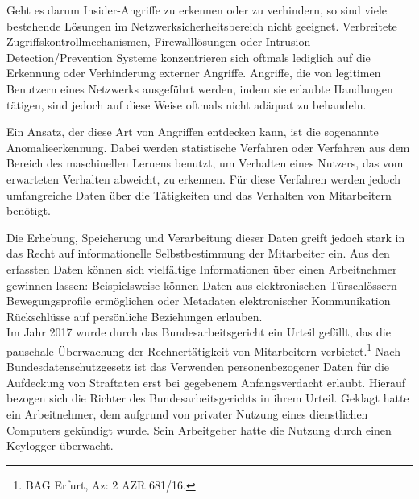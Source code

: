 
Geht es darum Insider-Angriffe zu erkennen oder zu verhindern, so sind viele bestehende Lösungen im Netzwerksicherheitsbereich nicht geeignet. Verbreitete Zugriffskontrollmechanismen, Firewalllösungen oder Intrusion Detection/Prevention Systeme konzentrieren sich oftmals lediglich auf die Erkennung oder Verhinderung externer Angriffe. Angriffe, die von legitimen Benutzern eines Netzwerks ausgeführt werden, indem sie erlaubte Handlungen tätigen, sind jedoch auf diese Weise oftmals nicht adäquat zu behandeln.

Ein Ansatz, der diese Art von Angriffen entdecken kann, ist die sogenannte Anomalieerkennung. Dabei werden statistische Verfahren oder Verfahren aus dem Bereich des maschinellen Lernens benutzt, um Verhalten eines Nutzers, das vom erwarteten Verhalten abweicht, zu erkennen. 
Für diese Verfahren werden jedoch umfangreiche Daten über die Tätigkeiten und das Verhalten von Mitarbeitern benötigt.


Die Erhebung, Speicherung und Verarbeitung dieser Daten greift jedoch stark in das Recht auf informationelle Selbstbestimmung der Mitarbeiter ein. Aus den erfassten Daten können sich vielfältige Informationen über einen Arbeitnehmer gewinnen lassen: Beispielsweise können Daten aus elektronischen Türschlössern Bewegungsprofile ermöglichen oder Metadaten elektronischer Kommunikation Rückschlüsse auf persönliche Beziehungen erlauben.\\
Im Jahr 2017 wurde durch das Bundesarbeitsgericht ein Urteil gefällt, das die pauschale Überwachung der Rechnertätigkeit von Mitarbeitern verbietet.\footnote{
  BAG Erfurt, Az: 2 AZR 681/16.
} Nach Bundesdatenschutzgesetz ist das Verwenden personenbezogener Daten für die Aufdeckung von Straftaten erst bei gegebenem Anfangsverdacht erlaubt. Hierauf bezogen sich die Richter des Bundesarbeitsgerichts in ihrem Urteil. Geklagt hatte ein Arbeitnehmer, dem aufgrund von privater Nutzung eines dienstlichen Computers gekündigt wurde. Sein Arbeitgeber hatte die Nutzung durch einen Keylogger überwacht. 



